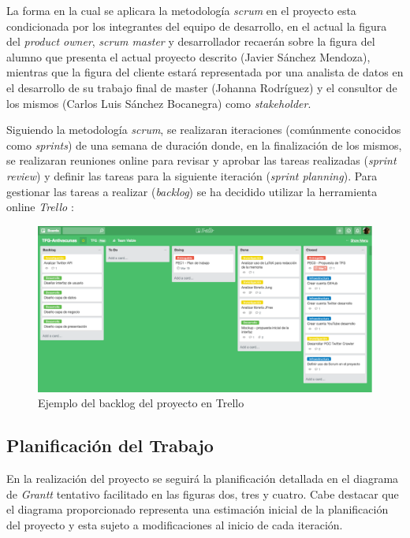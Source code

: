 \documentclass[11pt,a4paper]{article}
\begin{document}
La forma en la cual se aplicara la metodología \textit{scrum} en el proyecto esta condicionada por los integrantes del equipo de desarrollo, en el actual la figura del \textit{product owner}, \textit{scrum master} y desarrollador recaerán sobre la figura del alumno que presenta el actual proyecto descrito (Javier Sánchez Mendoza), mientras que la figura del cliente estará representada por una analista de datos en el desarrollo de su trabajo final de master (Johanna Rodríguez) y el consultor de los mismos (Carlos Luis Sánchez Bocanegra) como \textit{stakeholder}.

Siguiendo la metodología \textit{scrum}, se realizaran iteraciones (comúnmente conocidos como \textit{sprints}) de una semana de duración donde, en la finalización de los mismos, se realizaran reuniones online para revisar y aprobar las tareas realizadas (\textit{sprint review}) y definir las tareas para la siguiente iteración (\textit{sprint planning}). Para gestionar las tareas a realizar (\textit{backlog}) se ha decidido utilizar la herramienta online \textit{Trello} \cite{9}:

\begin{figure}[hbtp]
\centering
\includegraphics[scale=0.3]{planificacion/trello-backlog.png}
\caption{Ejemplo del backlog del proyecto en Trello}
\end{figure}

\subsection{Planificación del Trabajo}
En la realización del proyecto se seguirá la planificación detallada en el diagrama de \textit{Grantt} tentativo facilitado en las figuras dos, tres y cuatro. Cabe destacar que el diagrama proporcionado representa una estimación inicial de la planificación del proyecto y esta sujeto a modificaciones al inicio de cada iteración.
\end{document}
